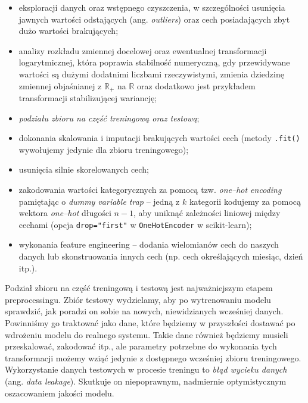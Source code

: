 \documentclass{myclass}
\begin{document}
\begin{itemize}
\item eksploracji danych oraz wstępnego czyszczenia, w szczególności usunięcia jawnych wartości
odstających (ang. \emph{outliers}) oraz cech posiadających zbyt dużo wartości brakujących;

\item analizy rozkładu zmiennej docelowej oraz ewentualnej transformacji logarytmicznej, która
poprawia stabilność numeryczną, gdy przewidywane wartości są dużymi dodatnimi liczbami
rzeczywistymi, zmienia dziedzinę zmiennej objaśnianej z \(\mathbb{R}_+\) na \(\mathbb{R}\) oraz
dodatkowo jest przykładem transformacji stabilizującej wariancję;
    
\item \emph{podziału zbioru na część treningową oraz testową};

\item dokonania skalowania i imputacji brakujących wartości cech (metody \texttt{.fit()} wywołujemy
jedynie dla zbioru treningowego);

\item usunięcia silnie skorelowanych cech;

\item zakodowania wartości kategorycznych za pomocą tzw. \emph{one--hot encoding} pamiętając o
\emph{dummy variable trap} -- jedną z \(k\) kategorii kodujemy za pomocą wektora \emph{one--hot}
długości \(n-1\), aby uniknąć zależności liniowej między cechami (opcja \texttt{drop="first"} w
\texttt{OneHotEncoder} w scikit-learn);

\item wykonania feature engineering -- dodania wielomianów cech do naszych danych lub skonstruowania
innych cech (np. cech określających miesiąc, dzień itp.).
\end{itemize}

Podział zbioru na część treningową i testową jest najważniejszym etapem preprocessingu. Zbiór
testowy wydzielamy, aby po wytrenowaniu modelu sprawdzić, jak poradzi on sobie na nowych,
niewidzianych wcześniej danych. Powinniśmy go traktować jako dane, które będziemy w przyszłości
dostawać po wdrożeniu modelu do realnego systemu. Takie dane również będziemy musieli przeskalować,
zakodować itp., ale parametry potrzebne do wykonania tych transformacji możemy wziąć jedynie z
dostępnego wcześniej zbioru treningowego. Wykorzystanie danych testowych w procesie treningu to
\emph{błąd wycieku danych} (ang. \emph{data leakage}). Skutkuje on niepoprawnym, nadmiernie
optymistycznym oszacowaniem jakości modelu.
\end{document}

